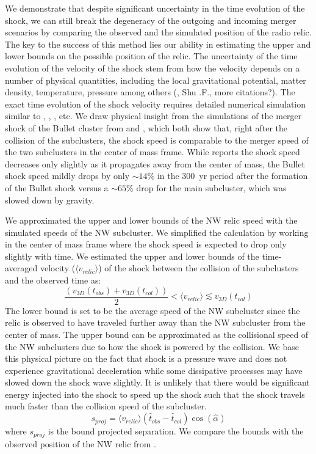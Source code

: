 We demonstrate that despite significant uncertainty in the time
evolution of the shock, we can still break the degeneracy of the
outgoing and incoming merger scenarios by comparing the observed and the
simulated position of the radio relic.
The key to the success of this method lies our ability in estimating the
upper and lower bounds on the possible position of the relic. The
uncertainty of the time evolution of the velocity of the shock stem from
how the velocity depends on a number of physical quantities, including the
local gravitational potential, matter density, temperature, pressure among
others (\citealt{E98}, Shu .F., more citations?).  The exact time evolution
of the shock velocity requires detailed numerical simulation similar to
\citet{Springel2007}, \citet{Vazza11}, \citet{Kang2007}, etc. 
We draw physical insight from the
simulations of the merger shock of the Bullet cluster from
\citet{Springel2007} and \citet{Paul2011b}, which both show
that, right after the collision of the subclusters, the shock speed is
comparable to the merger speed of the two subclusters in the center of mass
frame.  While \citet{Paul2011b} reports the shock speed decreases only
slightly as it propagates away from the center of mass, the Bullet shock
speed mildly drops by only $\sim 14\%$ in the 300~\mega yr period after the
formation of the Bullet shock versus a $\sim65\%$ drop for the main
subcluster, which was slowed down by gravity. \par 
We approximated the upper and lower bounds of the NW relic speed with the
simulated speeds of the NW subcluster.  We simplified the calculation by
working in the center of mass frame where the shock speed is expected to
drop only slightly with time. We estimated the upper and lower bounds of the
time-averaged velocity ($\langle v_{relic} \rangle$) of the shock between
the collision of the subclusters and the observed time as:  
\begin{equation}
	\frac{(v_{3D}(t_{obs}) + v_{3D}(t_{col}))}{2}	< \langle v_{relic} \rangle \lesssim v_{3D}(t_{col}) 
\end{equation}
The lower bound is set to be the average speed of the NW subcluster since the
relic is observed to have traveled further away than the NW subcluster from
the center of mass. The upper bound can be approximated as the collisional
speed of the NW subclusters due to how the shock is powered by the
collision. We base this physical picture on the fact that shock is a pressure wave
and does not experience gravitational deceleration while some dissipative
processes may have slowed down the shock wave slightly. It is unlikely that there
would be significant energy injected into the shock to speed up the shock
such that the shock travels much faster than the collision speed of the
subcluster.
\begin{equation}
	s_{proj} = \langle v_{relic} \rangle (\hat{t}_{obs} - \hat{t}_{col}) \cos(\hat{\alpha})
\end{equation}
where $s_{proj}$ is the bound projected separation. 
We compare the bounds with the observed position of the NW relic from
\citet{L13}. 


